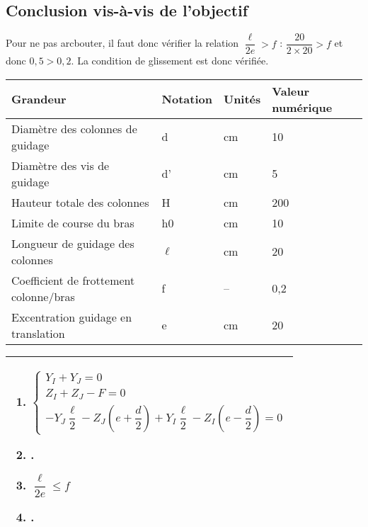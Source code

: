 \subsection*{Conclusion vis-à-vis de l'objectif}
\ifprof
\begin{corrige}
Pour ne pas arcbouter, il faut donc vérifier la relation $\dfrac{\ell}{2e} > f $ : $\dfrac{20}{2\times 20} > f $ et donc $0,5>0,2$.  La condition de glissement est donc vérifiée. 
\end{corrige}
\else
\fi



\ifprof
\else

\footnotesize
\noindent\begin{center}
\begin{tabular}{llll}
\hline
Grandeur & Notation & Unités & Valeur numérique \\ \hline
Diamètre des colonnes  de guidage & d & cm & 10 \\ 
Diamètre des vis de guidage & d' & cm & 5 \\ 
Hauteur totale des colonnes & H & cm & 200 \\ 
Limite de course du bras & h0 & cm & 10 \\ 
Longueur de guidage des colonnes & $\ell$  & cm & 20 \\ 
Coefficient de frottement colonne/bras & f & -- & 0,2 \\ 
Excentration guidage en translation & e & cm & 20 \\ \hline
\end{tabular}
\end{center}

\normalsize
\fi


\ifprof
\else
\begin{center}
\begin{tabular}{|p{.95\linewidth}|}
\hline

\begin{enumerate}
\item $\left\{
\begin{array}{l}
Y_I + Y_J = 0 \\
Z_I + Z_J -F = 0 \\ 
-Y_J \dfrac{\ell}{2}-Z_J \left(e+\dfrac{d}{2}\right) 
+Y_I \dfrac{\ell}{2}-Z_I \left(e-\dfrac{d}{2}\right) = 0
\end{array}
\right.$
\item .
\item $\dfrac{\ell}{2e} \leq f $
\item .
\end{enumerate} \\
\hline
\end{tabular}
\end{center}
\fi


